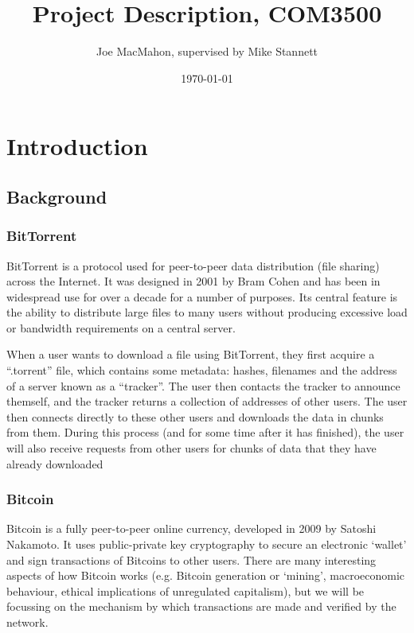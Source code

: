 \documentclass{article}
\title{Project Description, COM3500}
\author{Joe MacMahon, supervised by Mike Stannett}
\date{\today}
\begin{document}
\maketitle

\section{Introduction}
\subsection{Background}
\subsubsection{BitTorrent}
BitTorrent is a protocol used for peer-to-peer data distribution (file sharing) across the Internet.  It was designed in 2001 by Bram Cohen and has been in widespread use for over a decade for a number of purposes.  Its central feature is the ability to distribute large files to many users without producing excessive load or bandwidth requirements on a central server.

When a user wants to download a file using BitTorrent, they first acquire a ``.torrent'' file, which contains some metadata: hashes, filenames and the address of a server known as a ``tracker''.  The user then contacts the tracker to announce themself, and the tracker returns a collection of addresses of other users.  The user then connects directly to these other users and downloads the data in chunks from them.  During this process (and for some time after it has finished), the user will also receive requests from other users for chunks of data that they have already downloaded


\subsubsection{Bitcoin}
Bitcoin is a fully peer-to-peer online currency, developed in 2009 by Satoshi Nakamoto.  It uses public-private key cryptography to secure an electronic `wallet' and sign transactions of Bitcoins to other users.  There are many interesting aspects of how Bitcoin works (e.g. Bitcoin generation or `mining', macroeconomic behaviour, ethical implications of unregulated capitalism), but we will be focussing on the mechanism by which transactions are made and verified by the network.

\end{document}
